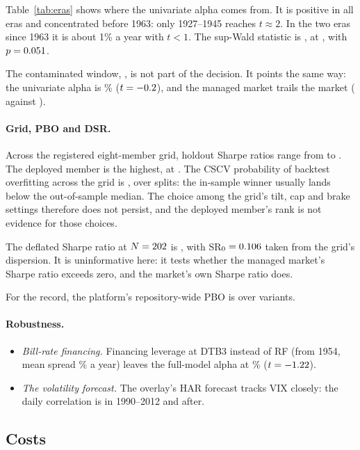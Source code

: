\documentclass[11pt]{article}
\begin{document}
Table~\ref{tab:eras} shows where the univariate alpha comes from. It is
positive in all \erasPos{} eras and concentrated before 1963: only
1927--1945 reaches $t\approx2$. In the two eras since 1963 it is about 1\% a
year with $t<1$. The sup-Wald statistic is \swStat, at \swAt, with $p=0.051$.

The contaminated window, \conSpan, is not part of the decision. It points the
same way: the univariate alpha is \conA\% ($t=-0.2$), and the managed market
trails the market (\conSRm{} against \conSRr).

\paragraph{Grid, PBO and DSR.} Across the registered eight-member grid,
holdout Sharpe ratios range from \gridSRmin{} to \gridSRmax. The deployed
member is the highest, at \gridSRprim. The CSCV probability of backtest
overfitting across the grid is \gridPBO, over \gridCombos{} splits: the
in-sample winner usually lands below the out-of-sample median. The choice
among the grid's tilt, cap and brake settings therefore does not persist,
and the deployed member's rank is not evidence for those choices.

The deflated Sharpe ratio at $N=202$ is \dsrProg{}, with
SR$_0=0.106$ taken from the grid's dispersion. It is uninformative
here: it tests whether the managed market's Sharpe ratio exceeds zero, and
the market's own Sharpe ratio does.

For the record, the platform's repository-wide PBO is \repoPBO{} over
\repoVariants{} variants.

\paragraph{Robustness.}
\begin{itemize}
\item \emph{Bill-rate financing.} Financing leverage at DTB3 instead of RF
  (from 1954, mean spread \dtbSpread\% a year) leaves the full-model alpha at
  \dtbFullA\% ($t=-1.22$).
\item \emph{The volatility forecast.} The overlay's HAR forecast tracks VIX
  closely: the daily correlation is \vixHold{} in 1990--2012 and \vixCon{}
  after.
\end{itemize}

\subsection{Costs}
\end{document}
